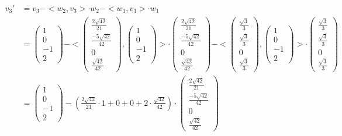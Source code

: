 \documentclass{article} %
\begin{document}
\begin{align*}
    v_3' &= v_3 - <w_2, v_3> \cdot  w_2  -  <w_1, v_3> \cdot  w_1 \\
    & = \begin{pmatrix} 
1\\0\\-1\\2
\end{pmatrix} - <\begin{pmatrix} 
\frac{2\sqrt{42}}{21}\\\frac{-5\sqrt{42}}{42}\\0\\\frac{\sqrt{42}}{42}
\end{pmatrix}, \begin{pmatrix} 
1\\0\\-1\\2
\end{pmatrix}> \cdot\begin{pmatrix} 
\frac{2\sqrt{42}}{21}\\\frac{-5\sqrt{42}}{42}\\0\\\frac{\sqrt{42}}{42} 
\end{pmatrix}  -  <\begin{pmatrix} 
\frac{\sqrt{3}}{3}\\\frac{\sqrt{3}}{3}\\0\\\frac{\sqrt{3}}{3}
\end{pmatrix} , \begin{pmatrix} 
1\\0\\-1\\2
\end{pmatrix}> \cdot  \begin{pmatrix} 
\frac{\sqrt{3}}{3}\\\frac{\sqrt{3}}{3}\\0\\\frac{\sqrt{3}}{3}
\end{pmatrix}  \\
%
& = \begin{pmatrix} 
1\\0\\-1\\2
\end{pmatrix}  - (\frac{2\sqrt{42}}{21} \cdot 1 + 0 + 0 + 2 \cdot  \frac{\sqrt{42}}{42}) \cdot \begin{pmatrix} 
\frac{2\sqrt{42}}{21}\\\frac{-5\sqrt{42}}{42}\\0\\\frac{\sqrt{42}}{42}

\end{pmatrix}
\end{align*}
\end{document}
